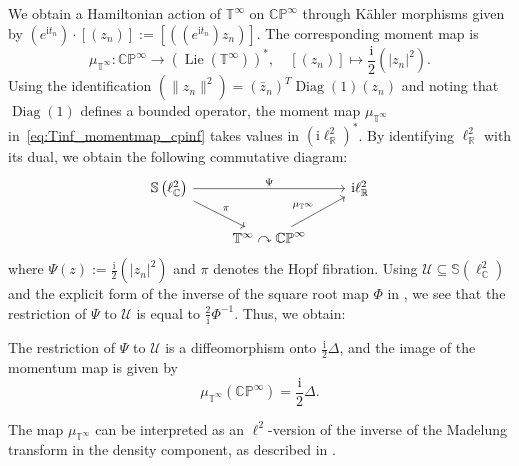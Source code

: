 \documentclass[runningheads]{llncs}
\def\RR{\mathbb{R}}
\begin{document}
We obtain a Hamiltonian action of $\mathbb{T}^{\infty}$ on $\mathbb{CP}^\infty$ through Kähler morphisms given by $\left(e^{\mathrm{i} t_n}\right) \cdot [(z_n)] :=  [((e^{\mathrm{i} t_n})z_n)]$.
The corresponding moment map is  
\begin{equation}\label{eq:Tinf_momentmap_cpinf}
	\mu_{\mathbb{T}^{\infty}}: \mathbb{CP}^\infty \to (\operatorname{Lie}(\mathbb{T}^{\infty}))^*, \quad [(z_n)] \mapsto \frac{\mathrm{i}}{2} (|z_n|^2).
\end{equation}  
Using the identification $(\|z_n\|^2) = (\bar{z}_n)^T \operatorname{Diag}(1) (z_n)$ and noting that $\operatorname{Diag}(1)$ defines a bounded operator, the moment map $\mu_{\mathbb{T}^\infty}$ in~\eqref{eq:Tinf_momentmap_cpinf} takes values in $(\mathrm{i} \ell^2_{\RR})^*$. 
By identifying $\ell^2_{\RR}$ with its dual, we obtain the following commutative diagram: 
\begin{equation}
	\begin{tikzcd}
		\mathbb{S}\left(\ell^2_{\mathbb{C}}\right) \arrow[rr, "\Psi"] \arrow[rd, "\pi"] & & \mathrm{i} \ell^2_{\mathbb{R}} \\
		& \mathbb{T}^\infty \curvearrowright \mathbb{CP}^\infty \arrow[ru, "\mu_{\mathbb{T}^\infty}"] &
	\end{tikzcd}
\end{equation}  
where $\Psi(z) := \frac{\mathrm{i}}{2} (|z_n|^2)$ and $\pi$ denotes the Hopf fibration. Using $\mathcal{U} \subseteq \mathbb{S}\left(\ell^2_{\mathbb{C}}\right)$ and the explicit form of the inverse of the square root map $\varPhi$ in ,  
we see that the restriction of $\Psi$ to $\mathcal{U}$ is equal to $\frac{2}{\mathrm{i}} \varPhi^{-1}$. Thus, we obtain:
\begin{lemma}\label{l: momentmap image}
	The restriction of $\Psi$ to $\mathcal{U}$ is a diffeomorphism onto $\frac{\mathrm{i}}{2} \Delta$, and the image of the momentum map is given by  
	\[
	\mu_{\mathbb{T}^\infty}(\mathbb{CP}^\infty) = \frac{\mathrm{i}}{2} \Delta.
	\]
\end{lemma}
\begin{remark}
The map \( \mu_{\mathbb{T}^{\infty}} \) can be interpreted as an \(\ell^2\)-version of the inverse of the Madelung transform in the density component, as described in \cite[Prop.~4.3]{khesin_geometry_2019}.
\end{remark}
\end{document}
